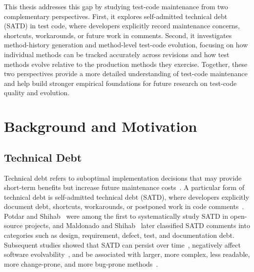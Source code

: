 This thesis addresses this gap by studying test-code maintenance from two complementary perspectives. First, it explores self-admitted technical debt (SATD) in test code, where developers explicitly record maintenance concerns, shortcuts, workarounds, or future work in comments. Second, it investigates method-history generation and method-level test-code evolution, focusing on how individual methods can be tracked accurately across revisions and how test methods evolve relative to the production methods they exercise. Together, these two perspectives provide a more detailed understanding of test-code maintenance and help build stronger empirical foundations for future research on test-code quality and evolution.

\section{Background and Motivation}

\subsection{Technical Debt}

Technical debt refers to suboptimal implementation decisions that may provide short-term benefits but increase future maintenance costs~\cite{seaman_technical_2015}. A particular form of technical debt is self-admitted technical debt (SATD), where developers explicitly document debt, shortcuts, workarounds, or postponed work in code comments~\cite{potdar_exploratory_2014}. Potdar and Shihab~\cite{potdar_exploratory_2014} were among the first to systematically study SATD in open-source projects, and Maldonado and Shihab~\cite{maldonado_detecting_2015} later classified SATD comments into categories such as design, requirement, defect, test, and documentation debt. Subsequent studies showed that SATD can persist over time~\cite{bavota_large-scale_2016}, negatively affect software evolvability~\cite{wehaibi_examining_2016}, and be associated with larger, more complex, less readable, more change-prone, and more bug-prone methods~\cite{chowdhury_evidence_2025}.


